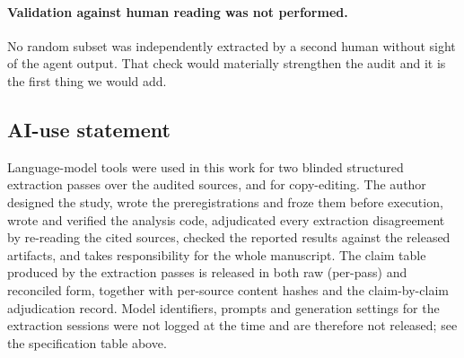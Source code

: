 \paragraph{Validation against human reading was not performed.}
No random subset was independently extracted by a second human without sight of
the agent output. That check would materially strengthen the audit and it is the
first thing we would add.

\subsection{AI-use statement}

Language-model tools were used in this work for two blinded structured
extraction passes over the audited sources, and for copy-editing. The author
designed the study, wrote the preregistrations and froze them before execution,
wrote and verified the analysis code, adjudicated every extraction disagreement
by re-reading the cited sources, checked the reported results against the
released artifacts, and takes responsibility for the whole manuscript. The
claim table produced by the extraction passes is released in both raw
(per-pass) and reconciled form, together with per-source content hashes and the
claim-by-claim adjudication record. Model identifiers, prompts and generation
settings for the extraction sessions were not logged at the time and are
therefore not released; see the specification table above.
